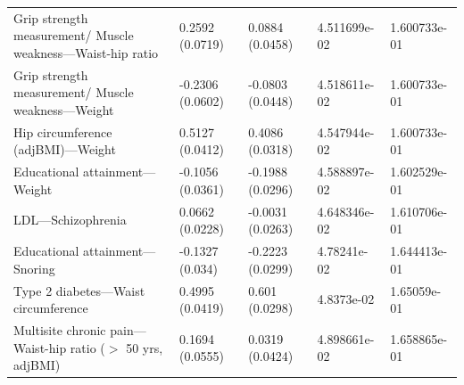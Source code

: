 \documentclass{article}\usepackage[]{graphicx}\usepackage[dvipsnames]{xcolor}
\begin{document}
\begin{longtable}{p{6cm}|p{1.5cm}|p{1.5cm}|p{1.5cm}}
  Grip strength measurement/ Muscle weakness---Waist-hip ratio & 0.2592 (0.0719) & 0.0884 (0.0458) & 4.511699e-02 & 1.600733e-01 \\ 
  Grip strength measurement/ Muscle weakness---Weight & -0.2306 (0.0602) & -0.0803 (0.0448) & 4.518611e-02 & 1.600733e-01 \\ 
  Hip circumference (adjBMI)---Weight & 0.5127 (0.0412) & 0.4086 (0.0318) & 4.547944e-02 & 1.600733e-01 \\ 
  Educational attainment---Weight & -0.1056 (0.0361) & -0.1988 (0.0296) & 4.588897e-02 & 1.602529e-01 \\ 
  LDL---Schizophrenia & 0.0662 (0.0228) & -0.0031 (0.0263) & 4.648346e-02 & 1.610706e-01 \\ 
  Educational attainment---Snoring & -0.1327 (0.034) & -0.2223 (0.0299) & 4.78241e-02 & 1.644413e-01 \\ 
  Type 2 diabetes---Waist circumference & 0.4995 (0.0419) & 0.601 (0.0298) & 4.8373e-02 & 1.65059e-01 \\ 
  Multisite chronic pain---Waist-hip ratio ($>$ 50 yrs, adjBMI) & 0.1694 (0.0555) & 0.0319 (0.0424) & 4.898661e-02 & 1.658865e-01 \\ 

   \hline
\end{longtable}
  
  
\end{document}
